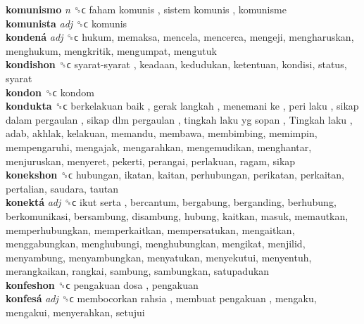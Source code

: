 \textbf{komunismo} \emph{n}  ␝ϲ   faham komunis ,  sistem komunis , komunisme  \\
\textbf{komunista} \emph{adj}  ␝ϲ  komunis  \\
\textbf{kondená} \emph{adj}  ␝ϲ  hukum, memaksa, mencela, mencerca, mengeji, mengharuskan, menghukum, mengkritik, mengumpat, mengutuk  \\
\textbf{kondishon} ␝ϲ   syarat-syarat , keadaan, kedudukan, ketentuan, kondisi, status, syarat  \\
\textbf{kondon} ␝ϲ  kondom  \\
\textbf{kondukta} ␝ϲ   berkelakuan baik ,  gerak langkah ,  menemani ke ,  peri laku ,  sikap dalam pergaulan ,  sikap dlm pergaulan ,  tingkah laku yg sopan ,  Tingkah laku , adab, akhlak, kelakuan, memandu, membawa, membimbing, memimpin, mempengaruhi, mengajak, mengarahkan, mengemudikan, menghantar, menjuruskan, menyeret, pekerti, perangai, perlakuan, ragam, sikap  \\
\textbf{konekshon} ␝ϲ  hubungan, ikatan, kaitan, perhubungan, perikatan, perkaitan, pertalian, saudara, tautan  \\
\textbf{konektá} \emph{adj}  ␝ϲ   ikut serta , bercantum, bergabung, berganding, berhubung, berkomunikasi, bersambung, disambung, hubung, kaitkan, masuk, memautkan, memperhubungkan, memperkaitkan, mempersatukan, mengaitkan, menggabungkan, menghubungi, menghubungkan, mengikat, menjilid, menyambung, menyambungkan, menyatukan, menyekutui, menyentuh, merangkaikan, rangkai, sambung, sambungkan, satupadukan  \\
\textbf{konfeshon} ␝ϲ   pengakuan dosa , pengakuan  \\
\textbf{konfesá} \emph{adj}  ␝ϲ   membocorkan rahsia ,  membuat pengakuan , mengaku, mengakui, menyerahkan, setujui  \\
